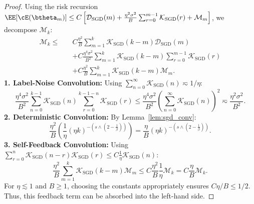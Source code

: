 \begin{proof}
Using the risk recursion $\EE[\cE(\btheta_m)] \le C \left[ \mathcal{D}_{\mathrm{SGD}}(m) + \frac{\eta^2\sigma^2}{B}\sum_{r=0}^{m-1} \mathcal{K}_{\mathrm{SGD}}(r) + \mathcal{M}_m \right]$, we decompose $\mathcal{M}_k$:
\begin{align*}
\mathcal{M}_k \le\quad & C\frac{\eta^2}{B} \sum_{m=1}^{k} \mathcal{K}_{\mathrm{SGD}}(k-m)\mathcal{D}_{\mathrm{SGD}}(m) \\
&+ C\frac{\eta^4\sigma^2}{B^2} \sum_{m=1}^{k} \mathcal{K}_{\mathrm{SGD}}(k-m) \sum_{r=0}^{m-1} \mathcal{K}_{\mathrm{SGD}}(r) \\
&+ C\frac{\eta^2}{B} \sum_{m=1}^{k} \mathcal{K}_{\mathrm{SGD}}(k-m)\mathcal{M}_m.
\end{align*}
\textbf{1. Label-Noise Convolution:} Using $\sum_{n=0}^\infty \mathcal{K}_{\mathrm{SGD}}(n) \eqsim 1/\eta$:
\[
\frac{\eta^4\sigma^2}{B^2} \sum_{n=0}^{k-1} \mathcal{K}_{\mathrm{SGD}}(n) \sum_{r=0}^{k-1-n} \mathcal{K}_{\mathrm{SGD}}(r) \le \frac{\eta^4\sigma^2}{B^2} \left(\sum_{n=0}^\infty \mathcal{K}_{\mathrm{SGD}}(n)\right)^2 \eqsim \frac{\eta^2\sigma^2}{B^2}. 
\]
\textbf{2. Deterministic Convolution:} By Lemma~\ref{lem:sgd_conv}:
\[
    \frac{\eta^2}{B} \left( \frac{1}{\eta} (\eta k)^{-\left(s \wedge \left(2-\frac{1}{\beta}\right)\right)} \right) = \frac{\eta}{B} (\eta k)^{-\left(s \wedge \left(2-\frac{1}{\beta}\right)\right)}.
\]
\textbf{3. Self-Feedback Convolution:} Using $\sum_{r=0}^n \mathcal{K}_{\mathrm{SGD}}(n-r)\mathcal{K}_{\mathrm{SGD}}(r) \le C \frac{1}{\eta} \mathcal{K}_{\mathrm{SGD}}(n)$:
\[
    \frac{\eta^2}{B} \sum_{m=1}^{k} \mathcal{K}_{\mathrm{SGD}}(k-m)\mathcal{M}_m \le C\frac{\eta^2}{B} \frac{1}{\eta} \mathcal{M}_k = C\frac{\eta}{B} \mathcal{M}_k.
\]
For $\eta \lesssim 1$ and $B \ge 1$, choosing the constants appropriately ensures $C\eta/B \le 1/2$. Thus, this feedback term can be absorbed into the left-hand side.
\end{proof}

